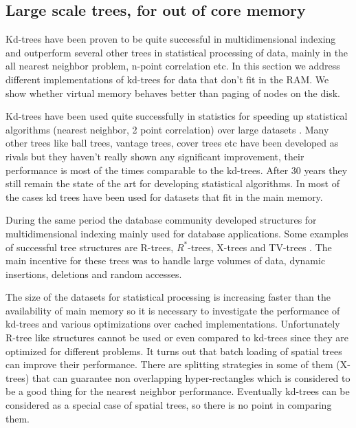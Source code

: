 \documentclass[12pt,letterpaper,doublespaced,ETD,dvips,proposal]{gtthesis}
\begin{document}
\begin{Body}

\subsection{Large scale trees, for out of core memory}
\label{Large_scale_trees}

Kd-trees have been proven to be quite successful in
multidimensional indexing and outperform several other
trees in statistical processing of data, mainly in the all nearest
neighbor problem, n-point correlation etc. In this section we
address different implementations of kd-trees for data that don't
fit in the RAM. We show whether virtual memory behaves better   than
paging of nodes on the disk.

Kd-trees have been used quite successfully in statistics for
speeding up statistical algorithms (nearest neighbor, 2 point
correlation) over large datasets \cite{gray2000nbp}. Many other trees like ball trees,
vantage trees, cover trees etc \cite{samet2005fma} have been developed as rivals but
they haven't really shown any significant improvement, their
performance is most of the times comparable to the kd-trees. After
30 years they still remain the state of the art for developing
statistical algorithms. In most of the cases kd trees have been used
for datasets that fit in the main memory.

During the same period the database community developed structures
for multidimensional indexing mainly used for database applications.
Some examples of successful tree structures are R-trees,
$R^{*}$-trees, X-trees and TV-trees \cite{samet2005fma}. The main incentive for these
trees was to handle large volumes of data, dynamic insertions,
deletions and random accesses.

The size of the datasets for statistical processing is increasing
faster than the availability of  main memory so it is necessary to
investigate the performance of kd-trees and various optimizations
over cached implementations. Unfortunately R-tree like structures
cannot be used or even compared to kd-trees since they are optimized
for different problems. It turns out that batch loading of spatial
trees can improve their performance. There are splitting strategies
in some of them (X-trees) that can guarantee non overlapping
hyper-rectangles which is considered to be a good thing for the
nearest neighbor performance. Eventually kd-trees can be considered
as a special case of spatial trees, so there is no point in
comparing them.


\end{Body}
\end{document}
